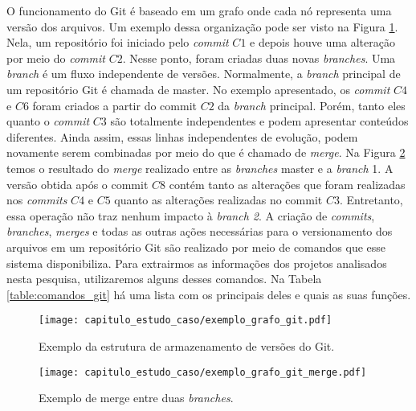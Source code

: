 O funcionamento do Git é baseado em um grafo onde cada nó  representa uma versão dos arquivos. Um exemplo dessa organização pode ser visto na Figura \ref{fig:cap_experimento_exemplo_grafo_git}. Nela, um repositório foi iniciado pelo \textit{commit} $C1$ e depois houve uma alteração por meio do \textit{commit} $C2$. Nesse ponto, foram criadas duas novas \textit{branches}. Uma \textit{branch} é um fluxo independente de versões. Normalmente, a \textit{branch} principal de um repositório Git é chamada de master. No exemplo apresentado, os \textit{commit}  $C4$ e $C6$ foram criados a partir do commit $C2$ da \textit{branch} principal. Porém, tanto eles quanto o \textit{commit} $C3$ são totalmente independentes e podem apresentar conteúdos diferentes. Ainda assim, essas linhas independentes de evolução, podem novamente serem combinadas por meio do que é chamado de \textit{merge}. Na Figura \ref{fig:cap_experimento_exemplo_grafo_git_merge}  temos o resultado do \textit{merge} realizado entre as \textit{branches} master e a \textit{branch} 1. A versão obtida após o commit $C8$ contém tanto as alterações que foram realizadas nos \textit{commits} $C4$ e $C5$ quanto as alterações realizadas no commit $C3$. Entretanto, essa operação não traz nenhum impacto à \textit{branch 2}. A criação de \textit{commits}, \textit{branches}, \textit{merges} e todas as outras ações necessárias para o versionamento dos arquivos em um repositório Git são realizado por meio de comandos que esse sistema disponibiliza. Para extrairmos as informações dos projetos analisados nesta pesquisa, utilizaremos alguns desses comandos.  Na Tabela \ref{table:comandos_git} há uma lista com os principais deles e quais as suas funções.  

 \begin{figure}[H]
  \centering
  \texttt{[image: capitulo\_estudo\_caso/exemplo\_grafo\_git.pdf]} 
  \caption{Exemplo da estrutura de armazenamento de versões do Git.}
  \label{fig:cap_experimento_exemplo_grafo_git} 
\end{figure}

 \begin{figure}[H]
  \centering
  \texttt{[image: capitulo\_estudo\_caso/exemplo\_grafo\_git\_merge.pdf]} 
  \caption{Exemplo de merge entre duas \textit{branches}.}
  \label{fig:cap_experimento_exemplo_grafo_git_merge} 
\end{figure}


